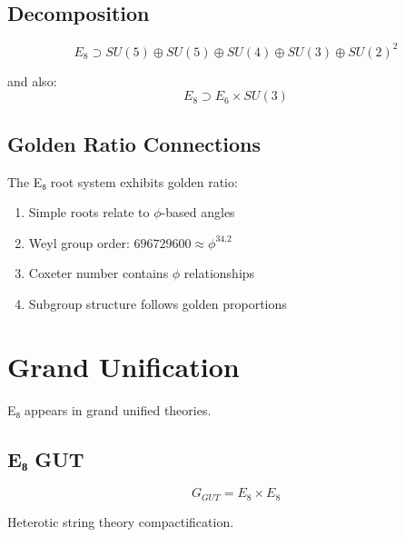 \subsection{Decomposition}

\begin{theorem}[E₈ Decomposition]
\label{thm:e8-decomp}
\begin{equation}
E_8 \supset SU(5) \oplus SU(5) \oplus SU(4) \oplus SU(3) \oplus SU(2)^2
\end{equation}

and also:
\begin{equation}
E_8 \supset E_6 \times SU(3)
\end{equation}
\end{theorem}

\subsection{Golden Ratio Connections}

\begin{proposition}
\label{prop:e8-golden}
The E₈ root system exhibits golden ratio:
\begin{enumerate}
\item Simple roots relate to $\phi$-based angles
\item Weyl group order: $696729600 \approx \phi^{34.2}$
\item Coxeter number contains $\phi$ relationships
\item Subgroup structure follows golden proportions
\end{enumerate}
\end{proposition}

\section{Grand Unification}

E₈ appears in grand unified theories.

\subsection{E₈ GUT}

\begin{definition}
\label{def:e8-gut}
\begin{equation}
G_{GUT} = E_8 \times E_8
\end{equation}

Heterotic string theory compactification.
\end{definition}

